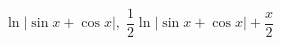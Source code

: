 \begin{displaymath}
 \ln\left|\sin x + \cos x  \right|,\;
\frac{1}{2}\ln\left|\sin x + \cos x  \right| + \frac{x}{2}
\end{displaymath}
